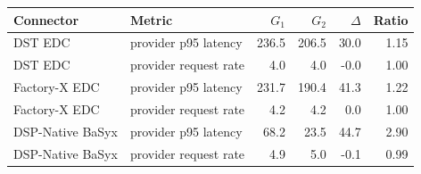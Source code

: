\begin{tabular}{llrrrr}
    \toprule
    Connector & Metric & $G_1$ & $G_2$ & $\Delta$ & Ratio \\
    \midrule
    DST EDC & provider p95 latency & 236.5 & 206.5 & 30.0 & 1.15 \\
    DST EDC & provider request rate & 4.0 & 4.0 & -0.0 & 1.00 \\
    Factory-X EDC & provider p95 latency & 231.7 & 190.4 & 41.3 & 1.22 \\
    Factory-X EDC & provider request rate & 4.2 & 4.2 & 0.0 & 1.00 \\
    DSP-Native BaSyx & provider p95 latency & 68.2 & 23.5 & 44.7 & 2.90 \\
    DSP-Native BaSyx & provider request rate & 4.9 & 5.0 & -0.1 & 0.99 \\
    \bottomrule
\end{tabular}
